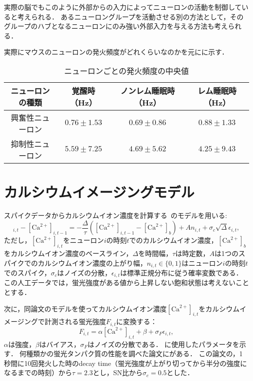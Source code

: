 実際の脳でもこのように外部からの入力によってニューロンの活動を制御していると考えられる．
あるニューロングループを活動させる別の方法として，そのグループのハブとなるニューロンにのみ強い外部入力を与える方法も考えられる．

実際にマウスのニューロンの発火頻度がどれくらいなのか\cite{Watson2016}を元にに示す．
\begin{table}[htb]
  \center
  \begin{tabular}{|c|ccc|} \hline
    ニューロンの種類 & 覚醒時（Hz） & ノンレム睡眠時（Hz） & レム睡眠時（Hz） \\ \hline
		興奮性ニューロン & $0.76 \pm 1.53$ & $0.69 \pm 0.86$ & $0.88 \pm 1.33$ \\
		抑制性ニューロン & $5.59 \pm 7.25$ & $4.69 \pm 5.62$ & $4.25 \pm 9.43$ \\ \hline
  \end{tabular}
  \caption{ニューロンごとの発火頻度の中央値}
  \label{tab:spike-frequency}
\end{table}

\section{カルシウムイメージングモデル}
スパイクデータからカルシウムイオン濃度を計算する~\cite{Vogelstein2009}のモデルを用いる:
\begin{equation}
  [\text{Ca}^{2+}]_{i,t} - [\text{Ca}^{2+}]_{i,t-1} = - \frac{\Delta}{\tau}([\text{Ca}^{2+}]_{i,t-1} - [\text{Ca}^{2+}]_b) + An_{i,t} + \sigma_c \sqrt{\Delta} \epsilon_{i,t},
  \label{eq:calcium}
\end{equation}
ただし，$[\text{Ca}^{2+}]_{i,t}$をニューロン$i$の時刻$t$でのカルシウムイオン濃度，$[\text{Ca}^{2+}]_b$をカルシウムイオン濃度のベースライン，$\Delta$を時間幅，$\tau$は時定数，$A$は1つのスパイクでのカルシウムイオン濃度の上がり幅，$n_{i,t} \in \{0,1\}$はニューロン$i$の時刻$t$でのスパイク，$\sigma_c$はノイズの分散，$\epsilon_{i,t}$は標準正規分布に従う確率変数である．
この人工データでは，蛍光強度がある値から上昇しない飽和状態は考えないこととする．

次に，同論文のモデルを使ってカルシウムイオン濃度$[\text{Ca}^{2+}]_{i,t}$をカルシウムイメージングで計測される蛍光強度$F_{i,t}$に変換する：
\begin{equation}
	F_{i,t} = \alpha[\text{Ca}^{2+}]_{i,t} + \beta + \sigma_F \epsilon_{i,t},
  \label{eq:intensity}
\end{equation}
$\alpha$は強度，$\beta$はバイアス，$\sigma_F$はノイズの分散である．
に使用したパラメータを示す．
何種類かの蛍光タンパク質の性能を調べた論文に\cite{Chen2013a}がある．
この論文の，1秒間に10回発火した時のdecay time（蛍光強度が上がり切ってから半分の強度になるまでの時刻）から$\tau = 2.3$とし，SN比から$\sigma_c = 0.5$とした．

